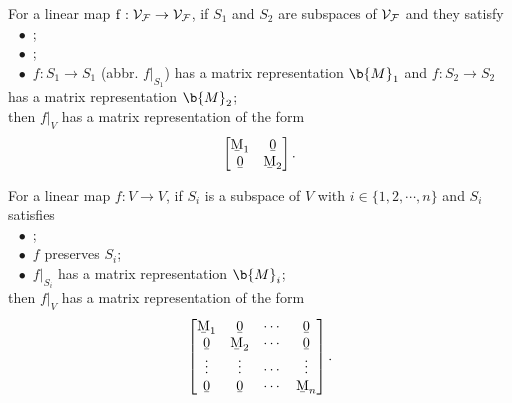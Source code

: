 \begin{theorem}
For a linear map $\operatorname{f}: \mathcal{V}_{\mathcal{F}} \to \mathcal{V}_{\mathcal{F}}$, if $S_1$ and $S_2$ are subspaces of $\mathcal{V}_{\mathcal{F}}$ and they satisfy \\
$~\ \, \bullet$ 
%
; \\
%
$~\ \, \bullet$
%
; \\
%
$~\ \, \bullet$ $f: S_1 \to S_1$ (abbr. $f|_{S_1}$) has a matrix representation $\b{M}_1$ and $f: S_2 \to S_2$ has a matrix representation $\b{M}_2$;\\
then $f|_{V}$ has a matrix representation of the form
$$
\begin{bmatrix}
\b{M}_1 & \b{0} \\
\b{0} & \b{M}_2
\end{bmatrix}.
$$
\end{theorem}
%

\begin{corollary} \label{JCF_prooflogic}
For a linear map $f: V \to V$, if $S_i$ is a subspace of $V$ with $i \in \{1, 2, \cdots, n\}$ and $S_i$ satisfies \\
$~\ \, \bullet$ ; \\
%
$~\ \, \bullet$ $f$ preserves $S_i$; \\
%
$~\ \, \bullet$  $f|_{S_i}$ has a matrix representation $\b{M}_i$;\\
then $f|_{V}$ has a matrix representation of the form
$$
\begin{bmatrix}
\b{M}_1 & \b{0}  &\cdots & \b{0} \\
\b{0}   &\b{M}_2 &\cdots & \b{0} \\
\vdots  &\vdots  &\cdots & \vdots \\
\b{0}   &\b{0}   &\cdots & \b{M}_n
\end{bmatrix}.
$$
\end{corollary}

